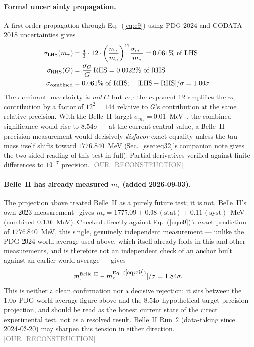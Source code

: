 \documentclass[twocolumn,prd,amsmath,amssymb,floatfix]{revtex4-2}
\newcommand{\reconstruction}{\textcolor{gray}{\small[OUR\_RECONSTRUCTION]}}
\begin{document}
\paragraph{Formal uncertainty propagation.}
A first-order propagation through Eq.~(\ref{eq:c9}) using PDG 2024 and
CODATA 2018 uncertainties gives:
\begin{align}
  \sigma_\mathrm{LHS}(m_\tau) &= \tfrac{4}{3}\cdot 12\cdot
    \left(\frac{m_\tau}{m_e}\right)^{11}\!\frac{\sigma_{m_\tau}}{m_e}
    = 0.061\%\text{ of LHS} \notag \\
  \sigma_\mathrm{RHS}(G) &= \frac{\sigma_G}{G}\,\mathrm{RHS}
    = 0.0022\%\text{ of RHS} \notag \\
  \sigma_\mathrm{combined} &= 0.061\%\text{ of RHS};\quad
    |\mathrm{LHS}-\mathrm{RHS}|/\sigma = 1.00\sigma .
\end{align}
The dominant uncertainty is \emph{not} $G$ but $m_\tau$: the exponent 12
amplifies the $m_\tau$ contribution by a factor of $12^2 = 144$ relative to $G$'s
contribution at the same relative precision.
With the Belle~II target $\sigma_{m_\tau} = 0.01$~MeV~\cite{belleii2019},
the combined significance would rise to $8.54\sigma$ — at the current
central value, a Belle~II-precision measurement would decisively
\emph{disfavor} exact equality unless the tau mass itself shifts toward
$1776.840$~MeV (Sec.~\ref{ssec:eq32}'s companion note gives the two-sided
reading of this test in full).
Partial derivatives verified against finite differences to $10^{-7}$ precision.
\reconstruction

\paragraph{Belle~II has already measured $m_\tau$ (added 2026-09-03).}
The projection above treated Belle~II as a purely future test; it is not.
Belle~II's own 2023 measurement~\cite{belleii2023taumass} gives
$m_\tau = 1777.09 \pm 0.08\,\mathrm{(stat)} \pm 0.11\,\mathrm{(syst)}$~MeV
(combined $0.136$~MeV). Checked directly against Eq.~(\ref{eq:c9})'s exact
prediction of $1776.840$~MeV, this single, genuinely independent
measurement — unlike the PDG-2024 world average used above, which itself
already folds in this and other measurements, and is therefore not an
independent check of an anchor built against an earlier world average —
gives
\begin{equation}
  |m_\tau^\mathrm{Belle~II} - m_\tau^\mathrm{Eq.~(\ref{eq:c9})}| / \sigma
  = 1.84\sigma .
\end{equation}
This is neither a clean confirmation nor a decisive rejection: it sits
between the $1.0\sigma$ PDG-world-average figure above and the
$8.54\sigma$ hypothetical target-precision projection, and should be
read as the honest current state of the direct experimental test, not
as a resolved result. Belle~II Run~2 (data-taking since 2024-02-20) may
sharpen this tension in either direction.
\reconstruction
\end{document}
